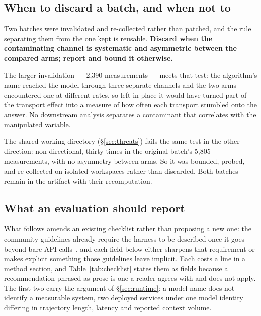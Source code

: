 \subsection{When to discard a batch, and when not to}

Two batches were invalidated and re-collected rather than patched, and the rule separating them from the
one kept is reusable. \textbf{Discard when the contaminating channel is systematic and asymmetric
between the compared arms; report and bound it otherwise.}

The larger invalidation --- 2{,}390 measurements --- meets that test: the algorithm's name reached the model
through three separate channels and the two arms encountered one at different rates, so left in place it
would have turned part of the transport effect into a measure of how often each transport stumbled onto the
answer. No downstream analysis separates a contaminant that correlates with the manipulated variable.

The shared working directory (\S\ref{sec:threats}) fails the same test in the other direction:
non-directional, thirty times in the original batch's 5{,}805 measurements, with no asymmetry between arms.
So it was bounded, probed, and re-collected on isolated workspaces rather than discarded. Both batches
remain in the artifact with their recomputation.

\subsection{What an evaluation should report}

What follows amends an existing checklist rather than proposing a new one: the community guidelines already
require the harness to be described once it goes beyond bare API calls~\citep{baltes2026guidelines}, and
each field below either sharpens that requirement or makes explicit something those guidelines leave
implicit. Each costs a line in a method section, and Table~\ref{tab:checklist} states them as fields
because a recommendation phrased as prose is one a reader agrees with and does not apply. The first two
carry the argument of \S\ref{sec:runtime}: a model name does not identify a measurable system, two
deployed services under one model identity differing in trajectory length, latency and reported context
volume.

